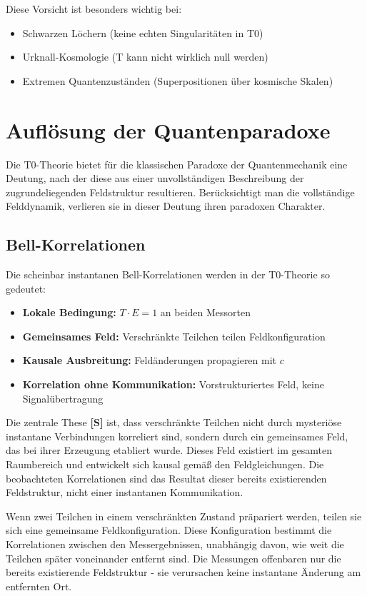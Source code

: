 	Diese Vorsicht ist besonders wichtig bei:
	\begin{itemize}
		\item Schwarzen Löchern (keine echten Singularitäten in T0)
		\item Urknall-Kosmologie (T kann nicht wirklich null werden)
		\item Extremen Quantenzuständen (Superpositionen über kosmische Skalen)
	\end{itemize}
	
	\section{Auflösung der Quantenparadoxe}
	
	Die T0-Theorie bietet für die klassischen Paradoxe der Quantenmechanik eine Deutung, nach der diese aus einer unvollständigen Beschreibung der zugrundeliegenden Feldstruktur resultieren. Berücksichtigt man die vollständige Felddynamik, verlieren sie in dieser Deutung ihren paradoxen Charakter.
	
	\subsection{Bell-Korrelationen}
	
	Die scheinbar instantanen Bell-Korrelationen werden in der T0-Theorie so gedeutet:
	
	\begin{itemize}
		\item \textbf{Lokale Bedingung:} $T \cdot E = 1$ an beiden Messorten
		\item \textbf{Gemeinsames Feld:} Verschränkte Teilchen teilen Feldkonfiguration
		\item \textbf{Kausale Ausbreitung:} Feldänderungen propagieren mit $c$
		\item \textbf{Korrelation ohne Kommunikation:} Vorstrukturiertes Feld, keine Signalübertragung
	\end{itemize}
	
	Die zentrale These \textbf{[S]} ist, dass verschränkte Teilchen nicht durch mysteriöse instantane Verbindungen korreliert sind, sondern durch ein gemeinsames Feld, das bei ihrer Erzeugung etabliert wurde. Dieses Feld existiert im gesamten Raumbereich und entwickelt sich kausal gemäß den Feldgleichungen. Die beobachteten Korrelationen sind das Resultat dieser bereits existierenden Feldstruktur, nicht einer instantanen Kommunikation.
	
	Wenn zwei Teilchen in einem verschränkten Zustand präpariert werden, teilen sie sich eine gemeinsame Feldkonfiguration. Diese Konfiguration bestimmt die Korrelationen zwischen den Messergebnissen, unabhängig davon, wie weit die Teilchen später voneinander entfernt sind. Die Messungen offenbaren nur die bereits existierende Feldstruktur - sie verursachen keine instantane Änderung am entfernten Ort.

